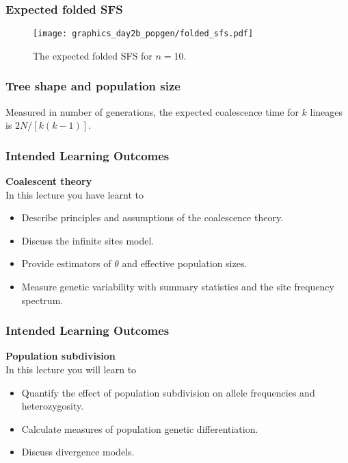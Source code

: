\documentclass{beamer}
\newcommand{\1}{\ensuremath{\mathbf{1}}}
\begin{document}
%
%
%
\begin{frame}\frametitle{Expected folded SFS}
	\begin{figure}
	\begin{center}
		\texttt{[image: graphics\_day2b\_popgen/folded\_sfs.pdf]}
	\end{center}
	\caption{The expected folded SFS for $n=10$.}
	\end{figure}
\end{frame}
%
%
%
\begin{frame}\frametitle{Tree shape and population size}
	Measured in number of generations, the expected coalescence time for $k$ lineages is $2N/[k(k - 1)]$.
	\begin{center}
	\end{center}
\end{frame}
%
%
%
\begin{frame}\frametitle{Intended Learning Outcomes}
	\textbf{Coalescent theory}\\[2ex]
	In this lecture you have learnt to
	\begin{itemize}
		\item Describe principles and assumptions of the coalescence theory.
		\item Discuss the infinite sites model.
		\item Provide estimators of $\theta$ and effective population sizes.
		\item Measure genetic variability with summary statistics and the site frequency spectrum.
	\end{itemize}
\end{frame}
%
%
%
\begin{frame}\frametitle{Intended Learning Outcomes}
	\textbf{Population subdivision}\\[2ex]
	In this lecture you will learn to
	\begin{itemize}
		\item Quantify the effect of population subdivision on allele frequencies and heterozygosity.
		\item Calculate measures of population genetic differentiation.
		\item Discuss divergence models.
	\end{itemize}
\end{frame}
\end{document}
